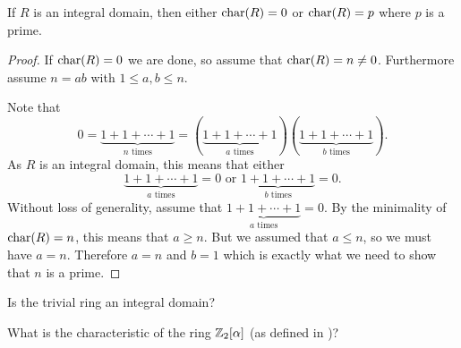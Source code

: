 \begin{proposition}\label{prop-zero-of-prime-characteristic-if-integral-domain}
    If $R$ is an integral domain, then either $\mathrm{char}(R) = 0$ or $\mathrm{char}(R) = p$ where $p$ is a prime.
\end{proposition}
\begin{proof}
    If $\mathrm{char}(R) = 0$ we are done, so assume that $\mathrm{char}(R) = n \neq 0$. Furthermore assume $n = ab$ with $1 \leq a,b \leq n$.

    Note that
    \[
        0 = \underbrace{1 + 1 + \cdots + 1}_{n \text{ times}} = (\underbrace{1+1+\cdots+1}_{a \text{ times}})(\underbrace{1+1+\cdots+1}_{b \text{ times}}).
    \]
    As $R$ is an integral domain, this means that either
    \[
        \underbrace{1+1+\cdots+1}_{a \text{ times}} = 0 \text{ or } \underbrace{1+1+\cdots+1}_{b \text{ times}} = 0.
    \]
    Without loss of generality, assume that $\underbrace{1+1+\cdots+1}_{a \text{ times}} = 0$. By the minimality of $\mathrm{char}(R) = n$, this means that $a \geq n$. But we assumed that $a \leq n$, so we must have $a = n$. Therefore $a = n$ and $b = 1$ which is exactly what we need to show that $n$ is a prime.
\end{proof}

\begin{exercise}\label{exercise-trivial-ring-is-not-an-integral-domain}
    Is the trivial ring an integral domain?
\end{exercise}
\begin{exercise}
    What is the characteristic of the ring $\mathbb{Z}_{2}[\alpha]$ (as defined in )?
\end{exercise}

